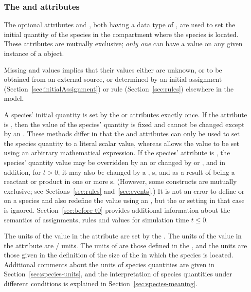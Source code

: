 \subsubsection{The  and
   attributes}
\label{sec:initialAmount}

The optional attributes  and
, both having a data type of
, are used to set the initial quantity of the
species in the compartment where the species is located.  These
attributes are mutually exclusive; \ie \emph{only one} can have a
value on any given instance of a \Species object.

Missing  and 
values implies that their values either are unknown, or to be
obtained from an external source, or determined by an initial
assignment (Section~\ref{sec:initialAssignment}) or rule
(Section~\ref{sec:rules}) elsewhere in the model.

A species' initial quantity is set by the  or
 attributes exactly once.
If the  attribute is ,
then the value of the species' quantity
is fixed and cannot be changed except
by an \InitialAssignment.  These methods differ in that the
 and 
attributes can only be used to set the species quantity
to a literal scalar value, whereas \InitialAssignment allows the
value to be set using an arbitrary mathematical expression.  If
the species'  attribute is ,
the species' quantity value may be overridden by an
\InitialAssignment or changed by \AssignmentRule or
\AlgebraicRule, and in addition, for $t > 0$, it may also be
changed by a \RateRule, \Event{}s, and as a result of being a
reactant or product in one or more \Reaction{}s. 
(However, some constructs are
mutually exclusive; see Sections~\ref{sec:rules}
and~\ref{sec:events}.) It is not an error to define
 or  on a species
and also redefine the value using an \InitialAssignment, but the
 or  setting in
that case is ignored.  Section~\ref{sec:before-t0} provides
additional information about the semantics of assignments, rules
and values for simulation time $t \leq 0$.

The units of the value in the  attribute are
set by the .  The units of the value in the
 attribute are
/ units.  The units of
 are those defined in the
, and the  units are those
given in the definition of the size of the \Compartment in which
the species is located.  Additional comments about the  units of
species quantities are given in Section~\ref{sec:species-units}, and 
the interpretation of species quantities under different
conditions is explained in Section~\ref{sec:species-meaning}.


